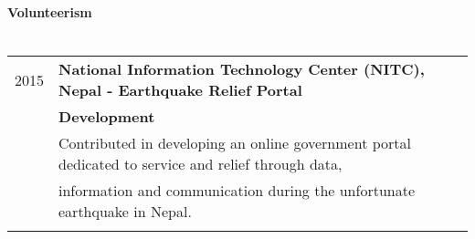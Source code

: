 \documentclass[letterpaper,10pt,oneside]{article}
\begin{document}
\paragraph{\large{Volunteerism}\\\\}
\noindent \begin{tabular}{l l}
 2015    & \textbf{National Information Technology Center (NITC), Nepal - Earthquake Relief Portal} \\
         & \textbf{Development} \\
         & Contributed in developing an online government portal dedicated to service and relief through data, \\
         & information and communication during the unfortunate earthquake in Nepal. \\
         \\
\end{tabular}
\end{document}
